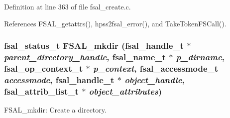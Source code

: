 Definition at line 363 of file fsal\_\-create.c.

References FSAL\_\-getattrs(), hpss2fsal\_\-error(), and TakeTokenFSCall().
\subsubsection[{FSAL\_\-mkdir}]{\setlength{\rightskip}{0pt plus 5cm}fsal\_\-status\_\-t FSAL\_\-mkdir (fsal\_\-handle\_\-t $\ast$ {\em parent\_\-directory\_\-handle}, \/  fsal\_\-name\_\-t $\ast$ {\em p\_\-dirname}, \/  fsal\_\-op\_\-context\_\-t $\ast$ {\em p\_\-context}, \/  fsal\_\-accessmode\_\-t {\em accessmode}, \/  fsal\_\-handle\_\-t $\ast$ {\em object\_\-handle}, \/  fsal\_\-attrib\_\-list\_\-t $\ast$ {\em object\_\-attributes})}\label{fsal__create_8c_8d7790c659b715e2e87bc57595a2cd71}


FSAL\_\-mkdir: Create a directory.

